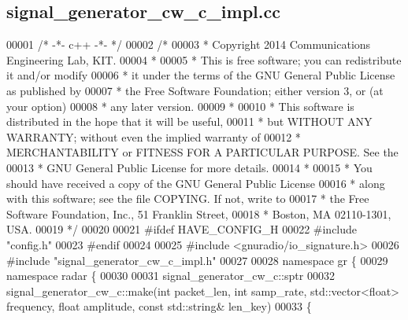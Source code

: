 \subsection{signal\+\_\+generator\+\_\+cw\+\_\+c\+\_\+impl.\+cc}
\label{signal__generator__cw__c__impl_8cc_source}

\begin{DoxyCode}
00001 \textcolor{comment}{/* -*- c++ -*- */}
00002 \textcolor{comment}{/* }
00003 \textcolor{comment}{ * Copyright 2014 Communications Engineering Lab, KIT.}
00004 \textcolor{comment}{ * }
00005 \textcolor{comment}{ * This is free software; you can redistribute it and/or modify}
00006 \textcolor{comment}{ * it under the terms of the GNU General Public License as published by}
00007 \textcolor{comment}{ * the Free Software Foundation; either version 3, or (at your option)}
00008 \textcolor{comment}{ * any later version.}
00009 \textcolor{comment}{ * }
00010 \textcolor{comment}{ * This software is distributed in the hope that it will be useful,}
00011 \textcolor{comment}{ * but WITHOUT ANY WARRANTY; without even the implied warranty of}
00012 \textcolor{comment}{ * MERCHANTABILITY or FITNESS FOR A PARTICULAR PURPOSE.  See the}
00013 \textcolor{comment}{ * GNU General Public License for more details.}
00014 \textcolor{comment}{ * }
00015 \textcolor{comment}{ * You should have received a copy of the GNU General Public License}
00016 \textcolor{comment}{ * along with this software; see the file COPYING.  If not, write to}
00017 \textcolor{comment}{ * the Free Software Foundation, Inc., 51 Franklin Street,}
00018 \textcolor{comment}{ * Boston, MA 02110-1301, USA.}
00019 \textcolor{comment}{ */}
00020  
00021 \textcolor{preprocessor}{#ifdef HAVE\_CONFIG\_H}
00022 \textcolor{preprocessor}{#include "config.h"}
00023 \textcolor{preprocessor}{#endif}
00024 
00025 \textcolor{preprocessor}{#include <gnuradio/io\_signature.h>}
00026 \textcolor{preprocessor}{#include "signal_generator_cw_c_impl.h"}
00027 
00028 \textcolor{keyword}{namespace }gr \{
00029   \textcolor{keyword}{namespace }radar \{
00030 
00031     signal_generator_cw_c::sptr
00032     signal_generator_cw_c::make(\textcolor{keywordtype}{int} packet\_len, \textcolor{keywordtype}{int} samp_rate, std::vector<float> 
      frequency, \textcolor{keywordtype}{float} amplitude, \textcolor{keyword}{const} std::string& len\_key)
00033     \{

\end{DoxyCode}
